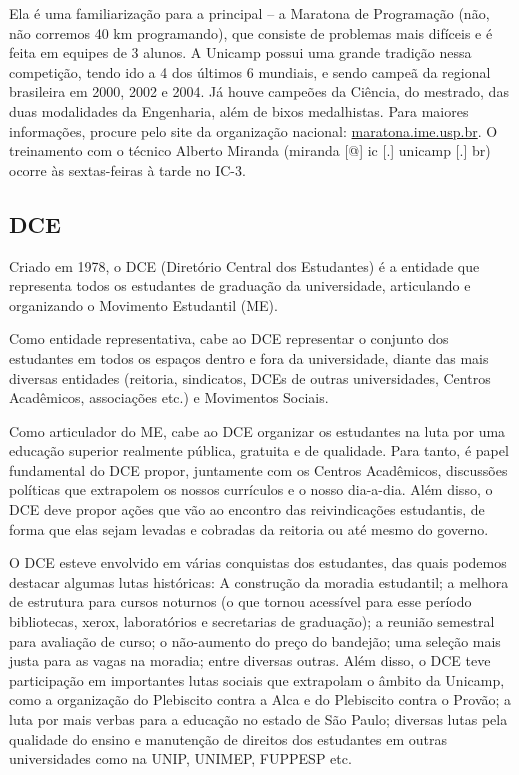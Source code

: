 Ela é uma familiarização para a principal -- a Maratona de Programação (não, não
corremos 40 km programando), que consiste de problemas mais difíceis e é feita
em equipes de 3 alunos. A Unicamp possui uma grande tradição nessa competição,
tendo ido a 4 dos últimos 6 mundiais, e sendo campeã da regional brasileira em
2000, 2002 e 2004. Já houve campeões da Ciência, do mestrado, das duas
modalidades da Engenharia, além de bixos medalhistas. Para maiores informações,
procure pelo site da organização nacional: \url{maratona.ime.usp.br}.
O treinamento com o técnico Alberto Miranda (miranda [@] ic [.] unicamp [.] br)
ocorre às sextas-feiras à tarde no IC-3.

\subsection{DCE}

Criado em 1978, o DCE (Diretório Central dos Estudantes) é a entidade que
representa todos os estudantes de graduação da universidade, articulando
e organizando o Movimento Estudantil (ME).

Como entidade representativa, cabe ao DCE representar o conjunto dos
estudantes em todos os espaços dentro e fora da universidade, diante das mais
diversas entidades (reitoria, sindicatos, DCEs de outras universidades, Centros
Acadêmicos, associações etc.) e Movimentos Sociais.

Como articulador do ME, cabe ao DCE organizar os estudantes na luta por uma
educação superior realmente pública, gratuita e de qualidade. Para tanto,
é papel fundamental do DCE propor, juntamente com os Centros Acadêmicos,
discussões políticas que extrapolem os nossos currículos e o nosso dia-a-dia.
Além disso, o DCE deve propor ações que vão ao encontro das reivindicações
estudantis, de forma que elas sejam levadas e cobradas da reitoria ou até mesmo
do governo.

O DCE esteve envolvido em várias conquistas dos estudantes, das quais podemos
destacar algumas lutas históricas: A construção da moradia estudantil; a melhora
de estrutura para cursos noturnos (o que tornou acessível para esse período
bibliotecas, xerox, laboratórios e secretarias de graduação); a reunião semestral
para avaliação de curso; o não-aumento do preço do bandejão; uma seleção mais
justa para as vagas na moradia; entre diversas outras. Além disso, o DCE teve
participação em importantes lutas sociais que extrapolam o âmbito da Unicamp,
como a organização do Plebiscito contra a Alca e do Plebiscito contra o Provão;
a luta por mais verbas para a educação no estado de São Paulo; diversas lutas
pela qualidade do ensino e manutenção de direitos dos estudantes em outras
universidades como na UNIP, UNIMEP, FUPPESP etc.

